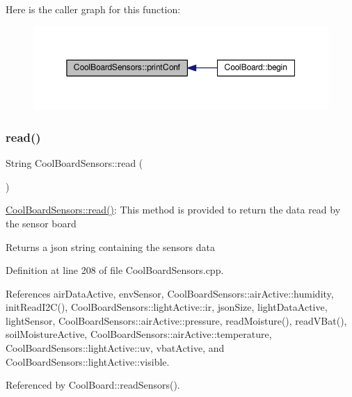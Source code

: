 Here is the caller graph for this function\+:\nopagebreak
\begin{figure}[H]
\begin{center}
\leavevmode
\includegraphics[width=350pt]{classCoolBoardSensors_af6fd79505815b204c178617ecf54c873_icgraph}
\end{center}
\end{figure}
\mbox{\label{classCoolBoardSensors_a91badb2539d91fda8679f2a597874c48}} 
\subsubsection{\texorpdfstring{read()}{read()}}
{\footnotesize\ttfamily String Cool\+Board\+Sensors\+::read (\begin{DoxyParamCaption}{ }\end{DoxyParamCaption})}

\hyperlink{classCoolBoardSensors_a91badb2539d91fda8679f2a597874c48}{Cool\+Board\+Sensors\+::read()}\+: This method is provided to return the data read by the sensor board

\begin{DoxyReturn}{Returns}
a json string containing the sensors data 
\end{DoxyReturn}


Definition at line 208 of file Cool\+Board\+Sensors.\+cpp.



References air\+Data\+Active, env\+Sensor, Cool\+Board\+Sensors\+::air\+Active\+::humidity, init\+Read\+I2\+C(), Cool\+Board\+Sensors\+::light\+Active\+::ir, json\+Size, light\+Data\+Active, light\+Sensor, Cool\+Board\+Sensors\+::air\+Active\+::pressure, read\+Moisture(), read\+V\+Bat(), soil\+Moisture\+Active, Cool\+Board\+Sensors\+::air\+Active\+::temperature, Cool\+Board\+Sensors\+::light\+Active\+::uv, vbat\+Active, and Cool\+Board\+Sensors\+::light\+Active\+::visible.



Referenced by Cool\+Board\+::read\+Sensors().


